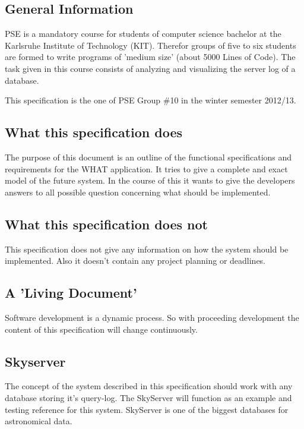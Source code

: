 

\subsection*{General Information}
\gls{PSE} is a mandatory course for students of computer science bachelor at the %
Karlsruhe Institute of Technology (\gls{KIT}). Therefor groups of five to six
students are formed to write programs of 'medium size' (about 5000 Lines of Code). 
The task given in this course consists of analyzing and visualizing the server log of a \gls{database}.

This specification is the one of \gls{PSE} Group \#10 in the winter semester 2012/13.


\subsection*{What this specification does}
The purpose of this document is an outline of the functional specifications and requirements
for the WHAT application. It tries to give a complete and exact model of the future system.
In the course of this it wants to give the developers answers to all possible question concerning
what should be implemented.


\subsection*{What this specification does not}
This specification does not give any information on how the system should be implemented. 
Also it doesn't contain any project planning or deadlines.


\subsection*{A 'Living Document'}
Software development is a dynamic process. So with proceeding development the
content of this specification will change continuously. 


\subsection*{Skyserver}
The concept of the system described in this specification should work with any \gls{database}
storing it's query-log. The \gls{SkyServer} will function
as an example and testing reference for this system. 
\gls{SkyServer} is one of the biggest \glspl{database} for astronomical data.
 
